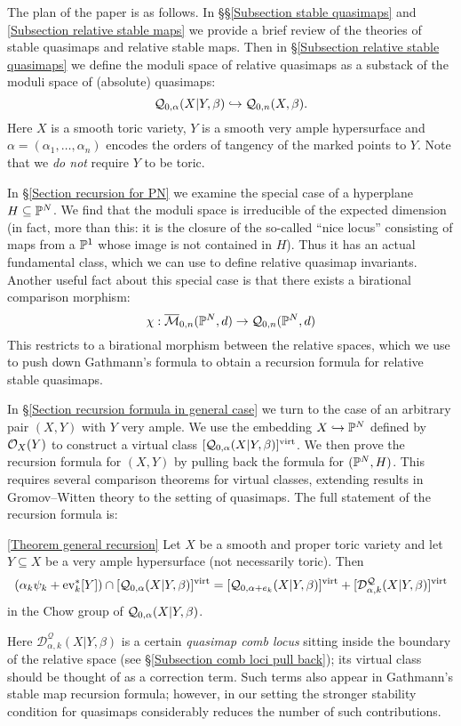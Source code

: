 The plan of the paper is as follows. In \S\S \ref{Subsection stable quasimaps} and \ref{Subsection relative stable maps} we provide a brief review of the theories of stable quasimaps and relative stable maps. Then in \S \ref{Subsection relative stable quasimaps} we define the moduli space of relative quasimaps as a substack of the moduli space of (absolute) quasimaps:
\begin{equation*} \mathcal{Q}_{0,\alpha}(X|Y,\beta) \hookrightarrow \mathcal{Q}_{0,n}(X,\beta). \end{equation*}
Here $X$ is a smooth toric variety, $Y$ is a smooth very ample hypersurface and $\alpha = (\alpha_1, \ldots, \alpha_n)$ encodes the orders of tangency of the marked points to $Y$. Note that we \emph{do not} require $Y$ to be toric.

In \S \ref{Section recursion for PN} we examine the special case of a hyperplane $H \subseteq \mathbb P^N$. We find that the moduli space is irreducible of the expected dimension (in fact, more than this: it is the closure of the so-called ``nice locus'' consisting of maps from a $\mathbb P^1$ whose image is not contained in $H$). Thus it has an actual fundamental class, which we can use to define relative quasimap invariants.
Another useful fact about this special case is that there exists a birational comparison morphism:
\begin{equation*} \chi : \overline{\mathcal{M}}_{0,n}(\mathbb P^N,d) \rightarrow \mathcal{Q}_{0,n}(\mathbb P^N,d) \end{equation*} 
This restricts to a birational morphism between the relative spaces, which we use to push down Gathmann's formula to obtain a recursion formula for relative stable quasimaps.

In \S \ref{Section recursion formula in general case} we turn to the case of an arbitrary pair $(X,Y)$ with $Y$ very ample. We use the embedding $X \hookrightarrow \mathbb P^N$ defined by $\mathcal{O}_X(Y)$ to construct a virtual class $[\mathcal{Q}_{0,\alpha}(X|Y,\beta)]^{\operatorname{virt}}$.
We then prove the recursion formula for $(X,Y)$ by pulling back the formula for $(\mathbb P^N,H)$. This requires several comparison theorems for virtual classes, extending results in Gromov--Witten theory to the setting of quasimaps. The full statement of the recursion formula is:

\begin{customthm}{\ref{Theorem general recursion}} Let $X$ be a smooth and proper toric variety and let $Y \subseteq X$ be a very ample hypersurface (not necessarily toric). Then
\begin{equation*} (\alpha_k \psi_k + \operatorname{ev}_k^* [Y]) \cap [\mathcal{Q}_{0,\alpha}(X|Y,\beta)]^{\operatorname{virt}} = [\mathcal{Q}_{0,\alpha+e_k}(X|Y,\beta)]^{\operatorname{virt}} + [\mathcal D^\mathcal{Q}_{\alpha,k}(X|Y,\beta)]^{\operatorname{virt}} \end{equation*}
in the Chow group of $\mathcal{Q}_{0,\alpha}(X|Y,\beta)$. 
\end{customthm}
\noindent Here $\mathcal D^\mathcal{Q}_{\alpha,k}(X|Y,\beta)$ is a certain \emph{quasimap comb locus} sitting inside the boundary of the relative space (see \S \ref{Subsection comb loci pull back}); its virtual class should be thought of as a correction term. Such terms also appear in Gathmann's stable map recursion formula; however, in our setting the stronger stability condition for quasimaps considerably reduces the number of such contributions.

